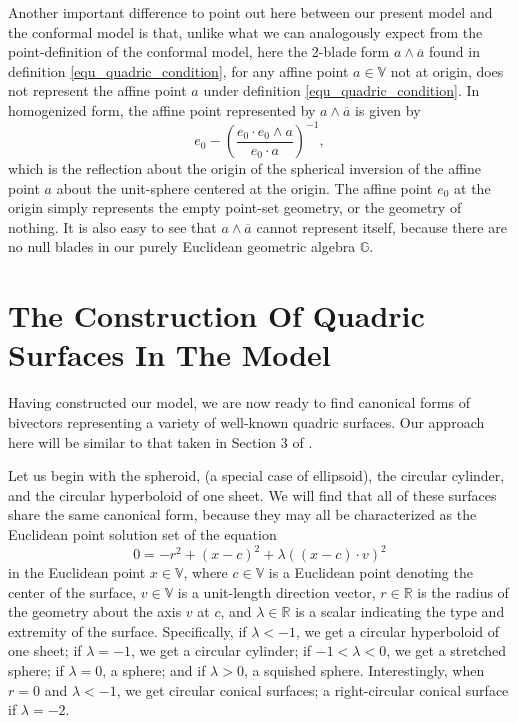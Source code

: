 \documentclass{birkjour}
\theoremstyle{definition}
\theoremstyle{remark}
\numberwithin{equation}{section}
\newcommand{\G}{\mathbb{G}}
\newcommand{\V}{\mathbb{V}}
\newcommand{\R}{\mathbb{R}}
\begin{document}
Another important difference to point out here between our present model and the conformal model is that,
unlike what we can analogously expect from the point-definition of the conformal model,
here the 2-blade form $a\wedge\overline{a}$ found in definition \eqref{equ_quadric_condition}, for
any affine point $a\in\V$ not at origin, does not represent the affine point $a$ under definition \eqref{equ_quadric_condition}.
In homogenized form, the affine point represented by $a\wedge\overline{a}$ is given by
\begin{equation}
e_0 - \left(\frac{e_0\cdot e_0\wedge a}{e_0\cdot a}\right)^{-1},
\end{equation}
which is the reflection about the origin of the spherical inversion of the affine point $a$
about the unit-sphere centered at the origin.  The affine point $e_0$ at the origin
simply represents the empty point-set geometry, or the geometry of nothing.  It is also
easy to see that $a\wedge\overline{a}$ cannot represent itself, because there are no
null blades in our purely Euclidean geometric algebra $\G$.

\section{The Construction Of Quadric Surfaces In The Model}

Having constructed our model, we are now ready to find canonical forms of bivectors
representing a variety of well-known quadric surfaces.  Our approach here will be
similar to that taken in Section 3 of \cite{Miller87}.

Let us begin with the
spheroid, (a special case of ellipsoid), the circular cylinder, and the circular hyperboloid
of one sheet.  We will find that all of these surfaces share the same canonical form,
because they may all be characterized as the Euclidean point solution set of the equation
\begin{equation}\label{equ_spheroid}
0 = -r^2 + (x-c)^2 + \lambda((x-c)\cdot v)^2
\end{equation}
in the Euclidean point $x\in\V$, where $c\in\V$ is a Euclidean
point denoting the center of the surface, $v\in\V$ is a unit-length direction
vector, $r\in\R$ is the radius of the geometry about the axis $v$ at $c$, and
$\lambda\in\R$ is a scalar indicating the type and extremity of the surface.
Specifically, if $\lambda<-1$, we get a circular hyperboloid of one sheet;
if $\lambda=-1$, we get a circular cylinder; if $-1<\lambda<0$, we get a stretched
sphere; if $\lambda=0$, a sphere; and if $\lambda>0$, a squished sphere.  Interestingly,
when $r=0$ and $\lambda<-1$, we get circular conical surfaces; a right-circular conical
surface if $\lambda=-2$.
\end{document}
